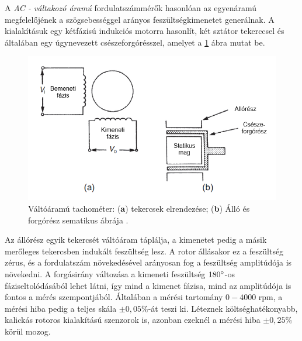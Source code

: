 A \textit{AC - váltakozó áramú} fordulatszámmérők hasonlóan az egyenáramú megfelelőjének a szögsebességgel arányos feszültségkimenetet generálnak. A kialakításuk egy kétfázisú indukciós motorra hasonlít, két sztátor tekerccsel és általában egy úgynevezett csészeforgórésszel, amelyet a \ref{actach} ábra mutat be. 
\begin{figure}
	\centering
	\includegraphics[width=\columnwidth*7/10]{figures/actach.png}
	\caption{Váltóáramú tachométer: (\textbf{a}) tekercsek elrendezése; (\textbf{b}) Álló és forgórész sematikus ábrája \cite{Morris2016b}.}
	\label{actach}
\end{figure}
Az állórész egyik tekercsét váltóáram táplálja, a kimenetet pedig a másik merőleges tekercsben indukált feszültség lesz. A rotor állásakor ez a feszültség zérus, és a fordulatszám növekedésével arányosan fog a feszültség amplitúdója is növekedni. A forgásirány változása a kimeneti feszültség $180\degree$-os fáziseltolódásából lehet látni, így mind a kimenet fázisa, mind az amplitúdója is fontos a mérés szempontjából. Általában a mérési tartomány $0-4000$ rpm, a mérési hiba pedig a teljes skála $\pm0,05\%$-át teszi ki. Léteznek költséghatékonyabb, kalickás rotoros kialakítású szenzorok is, azonban ezeknél a mérési hiba $\pm 0,25\%$ körül mozog.

